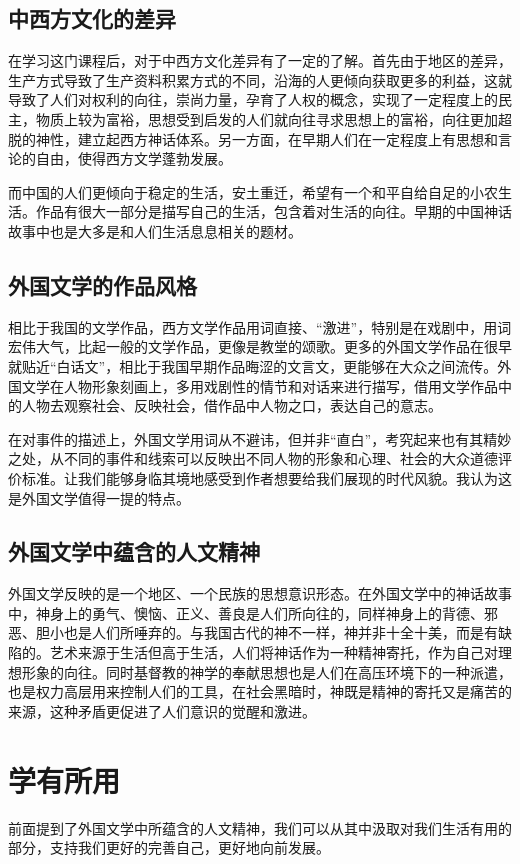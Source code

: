 \documentclass[AutoFakeBold]{LZUThesis}
\begin{document}
\section{中西方文化的差异}
在学习这门课程后，对于中西方文化差异有了一定的了解。首先由于地区的差异，生产方式导致了生产资料积累方式的不同，沿海的人更倾向获取更多的利益，这就导致了人们对权利的向往，崇尚力量，孕育了人权的概念，实现了一定程度上的民主，物质上较为富裕，思想受到启发的人们就向往寻求思想上的富裕，向往更加超脱的神性，建立起西方神话体系。另一方面，在早期人们在一定程度上有思想和言论的自由，使得西方文学蓬勃发展。

而中国的人们更倾向于稳定的生活，安土重迁，希望有一个和平自给自足的小农生活。作品有很大一部分是描写自己的生活，包含着对生活的向往。早期的中国神话故事中也是大多是和人们生活息息相关的题材。


\section{外国文学的作品风格}
相比于我国的文学作品，西方文学作品用词直接、“激进”，特别是在戏剧中，用词宏伟大气，比起一般的文学作品，更像是教堂的颂歌。更多的外国文学作品在很早就贴近“白话文”，相比于我国早期作品晦涩的文言文，更能够在大众之间流传。外国文学在人物形象刻画上，多用戏剧性的情节和对话来进行描写，借用文学作品中的人物去观察社会、反映社会，借作品中人物之口，表达自己的意志。

在对事件的描述上，外国文学用词从不避讳，但并非“直白”，考究起来也有其精妙之处，从不同的事件和线索可以反映出不同人物的形象和心理、社会的大众道德评价标准。让我们能够身临其境地感受到作者想要给我们展现的时代风貌。我认为这是外国文学值得一提的特点。

\section{外国文学中蕴含的人文精神}
外国文学反映的是一个地区、一个民族的思想意识形态。在外国文学中的神话故事中，神身上的勇气、懊恼、正义、善良是人们所向往的，同样神身上的背德、邪恶、胆小也是人们所唾弃的。与我国古代的神不一样，神并非十全十美，而是有缺陷的。艺术来源于生活但高于生活，人们将神话作为一种精神寄托，作为自己对理想形象的向往。同时基督教的神学的奉献思想也是人们在高压环境下的一种派遣，也是权力高层用来控制人们的工具，在社会黑暗时，神既是精神的寄托又是痛苦的来源，这种矛盾更促进了人们意识的觉醒和激进。

\chapter{学有所用}
前面提到了外国文学中所蕴含的人文精神，我们可以从其中汲取对我们生活有用的部分，支持我们更好的完善自己，更好地向前发展。
\end{document}
